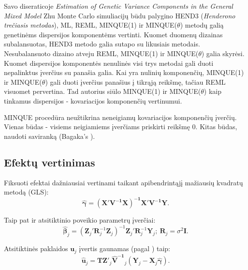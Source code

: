 \documentclass[12pt,a4paper]{article}
\begin{document}
Savo diseraticoje \textit{Estimation of Genetic Variance Components in the General Mixed Model}\cite{zhu} Zhu Monte Carlo simuliacijų būdu palygino HEND3 (\textit{Henderono trečiasis metodas}), ML, REML, MINQUE(1) ir MINQUE($\theta$) metodų galią genetinėms dispersijos komponentėms vertinti. Kuomet duomenų dizainas subalansuotas, HEND3 metodo galia sutapo su likusiais metodais. Nesubalansuoto dizaino atveju REML, MINQUE(1) ir MINQUE($\theta$) galia skyrėsi. Kuomet dispersijos komponentės nenulinės visi trys metodai gali duoti nepalinktus įverčius su panašia galia. Kai yra nulinių komponenčių, MINQUE(1) ir MINQUE($\theta$) gali duoti įverčius panašius į tikrąją reikšmę, tačiau REML visuomet pervertina. Tad autorius siūlo MINQUE(1) ir MINQUE($\theta$) kaip tinkamus dispersijos - kovariacijos komponenčių vertinumui.


\indent MINQUE procedūra neužtikrina neneigiamų kovariacijos komponenčių įverčių. Vienas būdas - visiems neigiamiems įverčiams priskirti reikšmę 0. Kitas būdas, naudoti saviranką (Bagaka's \cite{bagaka}).


\subsection{Efektų vertinimas}
\indent Fiksuoti efektai dažniausiai vertinami taikant apibendrintąjį mažiausių kvadratų metodą (GLS):
\begin{equation}\label{eq:gamma}
\boldsymbol{\hat{\gamma}}=\mathbf{\left(X'V^{-1}X\right)^{-1}X'V^{-1}Y}.
\end{equation}

Taip pat ir atsitiktinio poveikio parametrų įverčiai:
\begin{equation} \label{eq:beta}
\boldsymbol{\hat{\beta}}_j=\left(\mathbf{Z}_j'\mathbf{R}^{-1}_j\mathbf{Z}_j\right)^{-1}\mathbf{Z}_j'\mathbf{R}^{-1}_j\mathbf{Y}_j;\ \mathbf{R}_j=\sigma^2\mathbf{I}.
\end{equation}

Atsitiktinės paklaidos $\mathbf{u}_j$ įvertis gaunamas (pagal \cite{EBi}) taip:
\begin{equation}
\mathbf{\hat{u}}_j=\mathbf{TZ}'_j\mathbf{\hat{V}^{-1}}_j\left(\mathbf{Y}_j-\mathbf{X}_j\boldsymbol{\hat{\gamma}}\right).
\end{equation}
\end{document}

